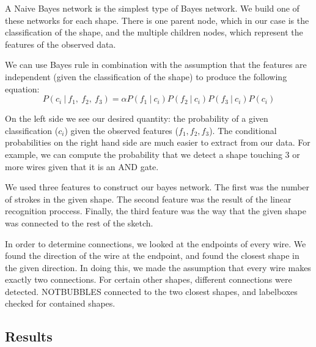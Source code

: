 \documentclass{article}
\begin{document}
A Naive Bayes network is the simplest type of Bayes network. We build one of these networks for each shape. There is one parent node, which in our case is the classification of the shape, and the multiple children nodes, which represent the features of the observed data.

We can use Bayes rule in combination with the assumption that the features are independent (given the classification of the shape) to produce the following equation:
\[
P(c_i\ |\ f_1,\ f_2,\ f_3) = \alpha P(f_1\ |\ c_i) P(f_2\ |\ c_i) P(f_3\ |\ c_i)P(c_i)
\]

On the left side we see our desired quantity: the probability of a given classification ($c_i$) given the observed features ($f_1, f_2, f_3$). The conditional probabilities on the right hand side are much easier to extract from our data. For example, we can compute the probability that we detect a shape touching 3 or more wires given that it is an AND gate.

We used three features to construct our bayes network. The first was the number of strokes in the given shape. The second feature was the result of the linear recognition proccess. Finally, the third feature was the way that the given shape was connected to the rest of the sketch.

In order to determine connections, we looked at the endpoints of every wire. We found the direction of the wire at the endpoint, and found the closest shape in the given direction. In doing this, we made the assumption that every wire makes exactly two connections. For certain other shapes, different connections were detected. NOTBUBBLES connected to the two closest shapes, and labelboxes checked for contained shapes.
\subsection{Results}
\end{document}
